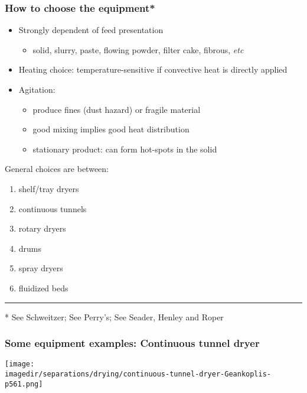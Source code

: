 \begin{frame}\frametitle{How to choose the equipment*}
	\begin{itemize}
		\item	Strongly dependent of feed presentation
		\begin{itemize}
			\item	solid, slurry, paste, flowing powder, filter cake, fibrous, \emph{etc}
		\end{itemize}
		\item	Heating choice: temperature-sensitive if convective heat is directly applied
		\item	Agitation: 
		\begin{itemize}
			\item	produce fines (dust hazard) or fragile material
			\item	good mixing implies good heat distribution
			\item	stationary product: can form hot-spots in the solid
		\end{itemize}
	\end{itemize}
	
	General choices are between:
	\begin{enumerate}
		\item	shelf/tray dryers
		\item	continuous tunnels
		\item	rotary dryers
		\item	drums
		\item	spray dryers
		\item	fluidized beds
	\end{enumerate}
	\vspace{4pt}
	\hrule
	\vspace{4pt}
	* See Schweitzer; See Perry's; See Seader, Henley and Roper
\end{frame}

\begin{frame}\frametitle{Some equipment examples: Continuous tunnel dryer}
	\begin{center}
		\texttt{[image: \\imagedir/separations/drying/continuous-tunnel-dryer-Geankoplis-p561.png]}
	\end{center}
	\vspace{-12pt}
\end{frame}

